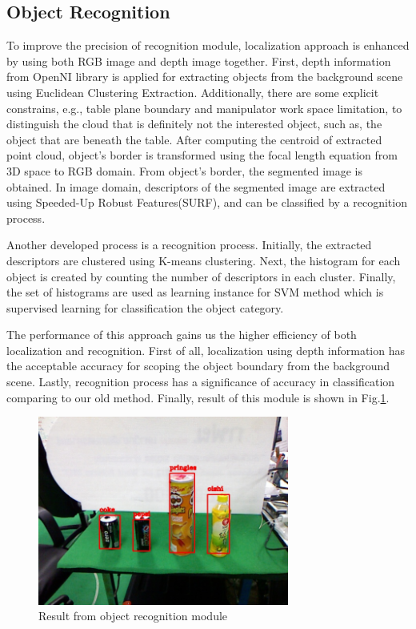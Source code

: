 \documentclass{llncs}
\begin{document}
\subsection{Object Recognition}
    
To improve the precision of recognition module, localization approach is enhanced by using both RGB image and depth image together. First, depth information from OpenNI library is applied for extracting objects from the background scene using Euclidean Clustering Extraction\cite{rudu.thesis}. Additionally, there are some explicit constrains, e.g., table plane boundary and manipulator work space limitation, to distinguish the cloud that is definitely not the interested object, such as, the object that are beneath the table. After computing the centroid of extracted point cloud, object's border is transformed using the focal length equation from 3D space to RGB domain. From object's border, the segmented image is obtained. In image domain, descriptors of the segmented image are extracted using Speeded-Up Robust Features(SURF), and can be classified by a recognition process.

Another developed process is a recognition process. Initially, the extracted descriptors are clustered using K-means clustering. Next, the histogram for each object is created by counting the number of descriptors in each cluster. Finally, the set of histograms are used as learning instance for SVM method which is supervised learning for classification the object category\cite{obj_rec}.

The performance of this approach gains us the higher efficiency of both localization and recognition. First of all, localization using depth information has the acceptable accuracy for scoping the object boundary from the background scene. Lastly, recognition process has a significance of accuracy in classification comparing to our old method. Finally, result of this module is shown in Fig.\ref{fig:object_recog}.

\begin{figure}
\centering
\includegraphics[height=6.2cm]{object_recognition_figure}
\caption{Result from object recognition module}
\label{fig:object_recog}
\end{figure}
\end{document}
